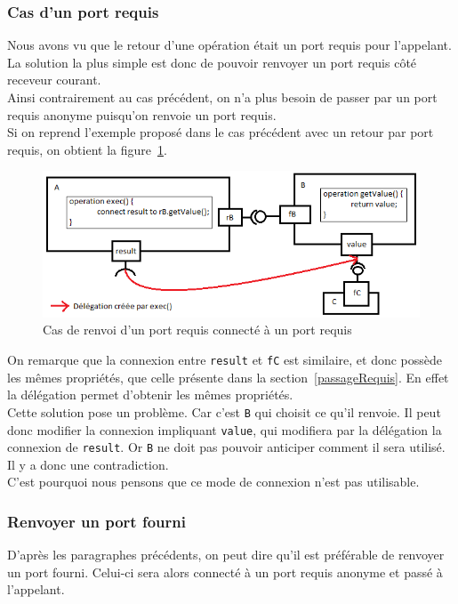 \documentclass[11pt,a4paper,openany,oneside]{book}
\begin{document}
\subsubsection{Cas d'un port requis}
Nous avons vu que le retour d'une opération était un port requis pour l'appelant. La solution la plus simple est donc de pouvoir renvoyer un port requis côté receveur courant.\\
Ainsi contrairement au cas précédent, on n'a plus besoin de passer par un port requis anonyme puisqu'on renvoie un port requis.\\
Si on reprend l'exemple proposé dans le cas précédent avec un retour par port requis, on obtient la figure~\ref{renvoiRequis}.\\
\begin{figure}[H]
\centering
\includegraphics[scale=0.7, keepaspectratio=true]{renvoiRequis.png}
\caption{Cas de renvoi d'un port requis connecté à un port requis}
\label{renvoiRequis}
\end{figure}
On remarque que la connexion entre \texttt{result} et \texttt{fC} est similaire, et donc possède les mêmes propriétés, que celle présente dans la section~\ref{passageRequis}. En effet la délégation permet d'obtenir les mêmes propriétés.\\
Cette solution pose un problème. Car c'est \texttt{B} qui choisit ce qu'il renvoie. Il peut donc modifier la connexion impliquant \texttt{value}, qui modifiera par la délégation la connexion de \texttt{result}. Or \texttt{B} ne doit pas pouvoir anticiper comment il sera utilisé. Il y a donc une contradiction.\\
C'est pourquoi nous pensons que ce mode de connexion n'est pas utilisable.

\subsubsection{Renvoyer un port fourni}
D'après les paragraphes précédents, on peut dire qu'il est préférable de renvoyer un port fourni. Celui-ci sera alors connecté à un port requis anonyme et passé à l'appelant.
\end{document}
